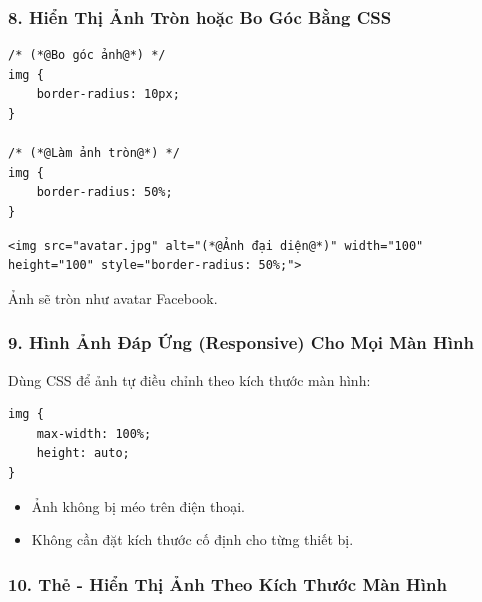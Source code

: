 \subsubsection{8. Hiển Thị Ảnh Tròn hoặc Bo Góc Bằng CSS}

\begin{codeWindow}
\begin{lstlisting}[language=HTML5]
/* (*@Bo góc ảnh@*) */
img {
    border-radius: 10px;
}

/* (*@Làm ảnh tròn@*) */
img {
    border-radius: 50%;
}
\end{lstlisting}
\end{codeWindow}

\begin{codeWindow}
\begin{lstlisting}[language=HTML5]
<img src="avatar.jpg" alt="(*@Ảnh đại diện@*)" width="100" height="100" style="border-radius: 50%;">
\end{lstlisting}
\end{codeWindow}

Ảnh sẽ tròn như avatar Facebook.

\subsubsection{9. Hình Ảnh Đáp Ứng (Responsive) Cho Mọi Màn Hình}

Dùng CSS để ảnh tự điều chỉnh theo kích thước màn hình:

\begin{codeWindow}
\begin{lstlisting}[language=HTML5]
img {
    max-width: 100%;
    height: auto;
}
\end{lstlisting}
\end{codeWindow}

\begin{tipBox}
\begin{itemize}[leftmargin=1.5em, itemsep=2pt, parsep=0pt]
    \item Ảnh không bị méo trên điện thoại.
    \item Không cần đặt kích thước cố định cho từng thiết bị.
\end{itemize}
\end{tipBox}

\subsubsection{10. Thẻ  - Hiển Thị Ảnh Theo Kích Thước Màn Hình}

